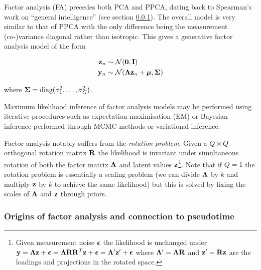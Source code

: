 Factor analysis (FA) precedes both PCA and PPCA, dating back to Spearman's work on ``general intelligence'' \cite{spearman1904general} (see section \ref{intr:fa_hist}). The overall model is very similar to that of PPCA with the only difference being the measurement (co-)variance diagonal rather than isotropic. This gives a generative factor analysis model of the form

\begin{equation} \label{eq:fa}
  \begin{aligned}
    \mathbf{z}_n & \sim \mathcal{N}(\bm{0}, \mathbf{I}) \\
    \mathbf{y}_n & \sim \mathcal{N}(\bm{\Lambda} \mathbf{z}_n + \bm{\mu}, \bm{\Sigma})
  \end{aligned}
\end{equation}

where $\bm{\Sigma} = \text{diag}(\sigma_1^2, \ldots, \sigma_G^2)$.

Maximum likelihood inference of factor analysis models may be performed using iterative procedures such as expectation-maximisation (EM) or Bayesian inference performed through MCMC methods or variational inference.

Factor analysis notably suffers from the \emph{rotation problem}. Given a $Q \times Q$ orthogonal rotation matrix $\mathbf{R}$ the likelihood is invariant under simultaneous rotation of both the factor matrix $\bm{\Lambda}$ and latent values $\mathbf{z}$\footnote{
Given measurement noise $\bm{\epsilon}$ the likelihood is unchanged under $\mathbf{y} = \bm{\Lambda} \mathbf{z} + \bm{\epsilon} = \bm{\Lambda} \mathbf{R} \mathbf{R}^T \mathbf{z} + \bm{\epsilon} = \bm{\Lambda}' \mathbf{z}' + \bm{\epsilon}$ where $\bm{\Lambda}' = \bm{\Lambda} \mathbf{R}$ and $\mathbf{z}' = \mathbf{R} \mathbf{z}$ are the loadings and projections in the rotated space.
}. %
Note that if $Q=1$ the rotation problem is essentially a scaling problem (we can divide $\bm{\Lambda}$ by $k$ and multiply $\mathbf{z}$ by $k$ to achieve the same likelihood) but this is solved by fixing the scales of $\bm{\Lambda}$ and $\mathbf{z}$ through priors.

\subsubsection{Origins of factor analysis and connection to pseudotime} \label{intr:fa_hist}



